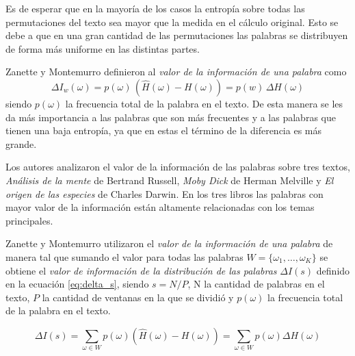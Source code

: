
Es de esperar que en la mayoría de los casos 
la entropía sobre todas las permutaciones del texto sea mayor que la medida en el cálculo original. Esto 
se debe a que en una gran cantidad de las permutaciones las palabras se distribuyen de forma más uniforme 
en las distintas partes.

Zanette y Montemurro definieron al \textit{valor de la información de una palabra} como
 \begin{equation}
  \Delta I_w(\omega) = p(\omega) \,  (\widehat{H}(\omega) - H(\omega))  =  p(w) \, \Delta{H(\omega)}
 \end{equation}
siendo $p(\omega)$ la frecuencia total de la palabra en el texto.
De esta manera se les da más importancia a las palabras que son más frecuentes y a las palabras que tienen una baja entropía, ya que en estas el término de la diferencia es más grande.

Los autores analizaron el valor de la información de las palabras sobre tres textos, \textit{Análisis de la mente} de Bertrand Russell, 
\textit{Moby Dick} de Herman Melville y \textit{El origen de las especies} de Charles Darwin. 
En los tres libros las palabras con mayor valor de la información están 
altamente relacionadas con los temas principales. 


Zanette y Montemurro utilizaron el \textit{valor de la información de una palabra} de manera tal que sumando el valor para todas las palabras $W = \{\omega_1,\dots,\omega_K\}$ se obtiene el \textit{valor de información de la distribución de las palabras} $\Delta I(s)$ definido en la ecuación \ref{eq:delta_s}, siendo  $s = N/P$, N la cantidad de palabras en el texto, $P$ la cantidad de ventanas en la que se dividió y $p(\omega)$ la frecuencia total de la palabra en el texto.

\begin{equation}
  \Delta I(s) = \sum\limits_{\omega \in W } p(\omega) (\widehat{H}(\omega) - H(\omega)) = \sum\limits_{\omega \in W } p(\omega) \Delta H(\omega) 
  \label{eq:delta_s}
\end{equation}

